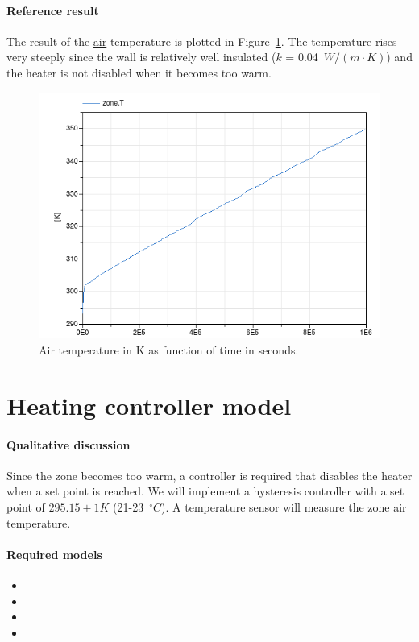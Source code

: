 \documentclass[10pt,a4paper]{article}
\begin{document}
\paragraph{Reference result}
The result of the \underline{air} temperature 
is plotted in Figure~\ref{fig:res4}.
The temperature rises very steeply since the 
wall is relatively well insulated ($k$ = 0.04~$W/(m\cdot K)$)
and the heater is not disabled when it becomes too warm.



\begin{figure}
\centering
\includegraphics[scale=0.6]{result4.png}
\caption{Air temperature in K as function of time in seconds.}
\label{fig:res4}
\end{figure}


\section{Heating controller model}
\paragraph{Qualitative discussion}
Since the zone becomes too warm, a controller
is required that disables the
heater when a set point is reached.
We will implement a hysteresis controller with a set point of $295.15 \pm 1 K$ 
(21-23~$^{\circ}C$).
A temperature sensor will measure the zone air temperature.


\paragraph{Required models}
\begin{itemize}
\item {}
\item {}
\item {}
\item {}
\end{itemize}
\end{document}
